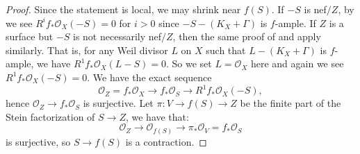 \documentclass[letterpaper,reqno,12pt]{amsart}
\numberwithin{equation}{section}
\theoremstyle{plain}
\begin{document}
\begin{proof}
    Since the statement is local, we may shrink near $f(S)$. If $-S$ is nef$/Z$, by \cite[1.1]{Bernasconiplvanishing} we see $R^if_*\mathcal O_X(-S)=0$ for $i>0$ since $-S-(K_X+\Gamma)$ is $f$-ample. If $Z$ is a surface but $-S$ is not necessarily nef$/Z$, then the same proof of \cite[2.2]{Bernasconiplvanishing} and \cite[2.8]{Bernasconibasepointfreeklt} apply similarly. That is, for any Weil divisor $L$ on $X$ such that $L-(K_X+\Gamma)$ is $f$-ample, we have $R^1f_*\mathcal O_X(L-S)=0$. So we set $L=\mathcal O_X$ here and again we see $R^1f_*\mathcal O_X(-S)=0$. We have the exact sequence 
    \[\mathcal O_Z=f_*\mathcal O_X\to f_*\mathcal O_S\to R^1f_*\mathcal O_X(-S),\] hence $\mathcal O_Z\to f_*\mathcal O_S$  is surjective. Let $\pi:V\to f(S)\to Z$ be the finite part of the Stein factorization of $S\to Z$, we have that:
    \[\mathcal O_Z\to\mathcal O_{f(S)}\to \pi_*\mathcal O_V=f_*\mathcal O_S\] is surjective, so $S\to f(S)$ is a contraction. 
    

\end{proof}
\end{document}
